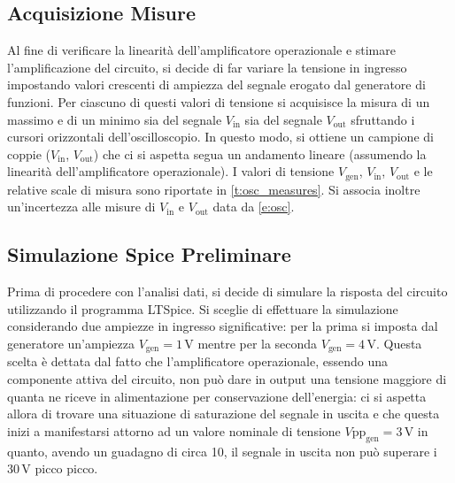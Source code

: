 \documentclass[a4paper,11pt]{article} %
\begin{document}

\subsection{Acquisizione Misure}
Al fine di verificare la linearità dell'amplificatore operazionale e stimare l'amplificazione del circuito, si decide di
far variare la tensione in ingresso impostando valori crescenti di ampiezza del segnale erogato dal generatore di
funzioni. Per ciascuno di questi valori di tensione si acquisisce la misura di un massimo e di un minimo sia del segnale
$V_{\text{in}}$ sia del segnale $V_{\text{out}}$ sfruttando i cursori orizzontali dell'oscilloscopio. In questo modo, si
ottiene un campione di coppie ($V_{\text{in}}$, $V_{\text{out}}$) che ci si aspetta segua un andamento lineare (assumendo
la linearità dell'amplificatore operazionale). I valori di tensione $V_{\text{gen}}$, $V_{\text{in}}$, $V_{\text{out}}$ e
le relative scale di misura sono riportate in  \autoref{t:osc_measures}. Si associa inoltre un'incertezza alle misure
di $V_{\text{in}}$ e $V_{\text{out}}$ data da  \autoref{e:osc}.\\


\subsection{Simulazione Spice Preliminare}\label{s:spice} Prima di procedere con l'analisi dati, si decide di simulare
la risposta del circuito utilizzando il programma LTSpice. Si sceglie di effettuare la simulazione considerando due
ampiezze in ingresso significative: per la prima si imposta dal generatore un'ampiezza $V_{\text{gen}}=1\,\si{\volt}$
mentre per la seconda $V_{\text{gen}}=4\,\si{\volt}$. Questa scelta è dettata dal fatto che l'amplificatore
operazionale, essendo una componente attiva del circuito, non può dare in output una tensione maggiore di quanta ne
riceve in alimentazione per conservazione dell'energia: ci si aspetta allora di trovare una situazione di saturazione
del segnale in uscita e che questa inizi a manifestarsi attorno ad un valore nominale di tensione
$V\text{pp}_{\text{gen}}=3\,\si{\volt}$ in quanto, avendo un guadagno di circa 10, il segnale in uscita non può superare
i $30\,\si{\volt}$ picco picco.
\end{document}
